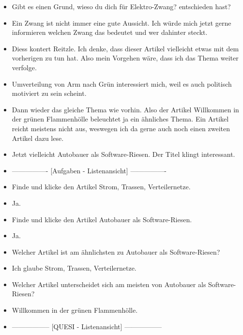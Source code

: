 {\begin{itemize}[]
            \item {} Gibt es einen Grund, wieso du dich für \flqq Elektro-Zwang?\frqq{} entschieden hast?
            \item {} Ein Zwang ist nicht immer eine gute Aussicht.
                  Ich würde mich jetzt gerne informieren welchen Zwang das bedeutet und wer dahinter steckt.
            \item {} \flqq Diess kontert Reitzle\frqq{}. Ich denke, dass dieser Artikel vielleicht etwas mit dem vorherigen zu tun hat.
                  Also mein Vorgehen wäre, dass ich das Thema weiter verfolge.
            \item {} \flqq Umverteilung von Arm nach Grün\frqq{} interessiert mich, weil es auch politisch motiviert zu sein scheint.
            \item {} Dann wieder das gleiche Thema wie vorhin.
                  Also der Artikel \flqq Willkommen in der grünen Flammenhölle\frqq{} beleuchtet ja ein ähnliches Thema.
                  Ein Artikel reicht meistens nicht aus, weswegen ich da gerne auch noch einen zweiten Artikel dazu lese.
            \item {} Jetzt vielleicht \flqq Autobauer als Software-Riesen\frqq{}.
                  Der Titel klingt interessant.
            \item {----------------} [Aufgaben - Listenansicht] {----------------}
            \item {} Finde und klicke den Artikel \flqq Strom, Trassen, Verteilernetze\frqq{}.
            \item {} Ja.
            \item {} Finde und klicke den Artikel \flqq Autobauer als Software-Riesen\frqq{}.
            \item {} Ja.
            \item {} Welcher Artikel ist am ähnlichsten zu \flqq Autobauer als Software-Riesen\frqq{}?
            \item {} Ich glaube \flqq Strom, Trassen, Verteilernetze\frqq{}.
            \item {} Welcher Artikel unterscheidet sich am meisten von \flqq Autobauer als Software-Riesen\frqq{}?
            \item {} \flqq Willkommen in der grünen Flammenhölle\frqq{}.
            \item {-----------------} [QUESI - Listenansicht] {-----------------}

\end{itemize}}
